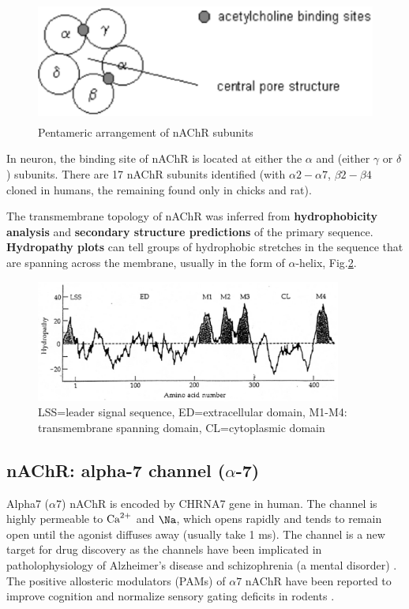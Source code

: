 \begin{figure}[hbt]
  \centerline{\includegraphics[height=4cm,
    angle=0]{./images/nAChR.eps}}
  \caption{Pentameric arrangement of nAChR subunits}
\label{fig:nAChR}
\end{figure}

In neuron, the binding site of nAChR is located at either the $\alpha$
and (either $\gamma$ or $\delta$) subunits.  
There are 17 nAChR subunits
identified (with $\alpha2-\alpha7$, $\beta2-\beta4$ cloned in humans, the
remaining found only in chicks and rat).

The transmembrane topology of nAChR was inferred from {\bf hydrophobicity
analysis} and {\bf secondary structure predictions} of the primary sequence.
{\bf Hydropathy plots} can tell groups of hydrophobic stretches in the sequence
that are spanning across the membrane, usually in the form of $\alpha$-helix,
Fig.\ref{fig:nAChR_hydropathy_plot}.

\begin{figure}[hbt]
  \centerline{\includegraphics[height=4cm,
    angle=0]{./images/hydropathy_plot_nAChR.eps}}
  \caption{LSS=leader signal sequence, ED=extracellular domain, M1-M4:
  transmembrane spanning domain, CL=cytoplasmic domain}
\label{fig:nAChR_hydropathy_plot}
\end{figure}



\subsection{nAChR: alpha-7 channel ($\alpha$-7)}
\label{sec:alpha-7-nAChR}

Alpha7 ($\alpha7$) nAChR is encoded by CHRNA7 gene in human. The channel is
highly permeable to ${\text{Ca}^{2+}}$ and $\Na$, which opens rapidly and tends to remain
open until the agonist diffuses away (usually take 1 ms). The channel is a new
target for drug discovery as the channels have been implicated in
patholophysiology of Alzheimer's disease and schizophrenia (a mental disorder)
\citep{jensen2005, gotti2006}. The positive allosteric modulators (PAMs) of
$\alpha7$ nAChR have been reported to improve cognition and normalize sensory
gating deficits in rodents \citep{timmermann2007, gronlien2007}. 

